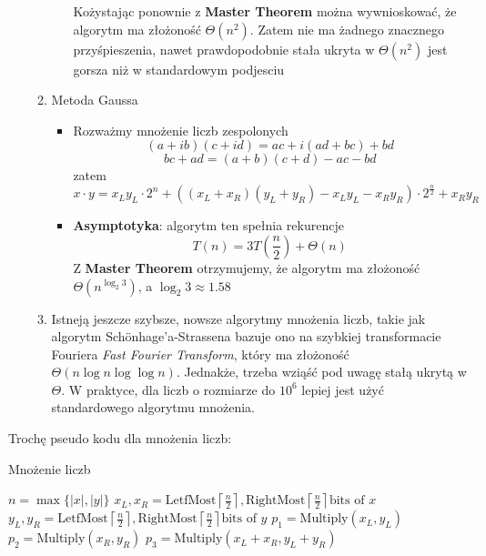 \documentclass[11pt,a4paper]{article}
\begin{document}
\begin{itemize}
\begin{enumerate}
\begin{itemize}
\[                        \]
                        Kożystając ponownie z \textbf{Master Theorem} można wywnioskować, że algorytm ma złożoność $\Theta(n^2)$. Zatem nie ma żadnego znacznego przyśpieszenia, nawet prawdopodobnie stała ukryta w $\Theta(n^2)$ jest gorsza niż w standardowym podjesciu
                \end{itemize}
            \item Metoda Gaussa
                \begin{itemize}
                    \item Rozważmy mnożenie liczb zespolonych
                        \[
                            (a+ib)(c+id) = ac + i(ad+bc) + bd
                        \]
                        \[
                            bc + ad = (a+b)(c+d) - ac - bd
                        \]
                        zatem
                        \[
                            x \cdot y = x_Ly_L \cdot 2^n + ((x_L + x_R)(y_L + y_R) - x_Ly_L - x_Ry_R) \cdot 2^{\frac{n}{2}} + x_Ry_R
                        \]
                    \item \textbf{Asymptotyka}: algorytm ten spełnia rekurencje
                        \[
                            T(n) = 3T(\frac{n}{2}) + \Theta(n)
                        \]
                        Z \textbf{Master Theorem} otrzymujemy, że algorytm ma złożoność $\Theta(n^{\log_2 3})$, a $\log_2 3 \approx 1.58$
                \end{itemize}
            \item Istneją jeszcze szybsze, nowsze algorytmy mnożenia liczb, takie jak algorytm Schönhage'a-Strassena bazuje ono na szybkiej transformacie Fouriera \textit{Fast Fourier Transform}, który ma złożoność $\Theta(n \log n \log \log n)$. Jednakże, trzeba wziąść pod uwagę stałą ukrytą w $\Theta$. W praktyce, dla liczb o rozmiarze do $10^6$ lepiej jest użyć standardowego algorytmu mnożenia.
        \end{enumerate}
\end{itemize}
Trochę pseudo kodu dla mnożenia liczb:
\begin{algorithm}
    \caption{Mnożenie liczb}
    \begin{algorithmic}[1]
        \State $n = \max\{|x|, |y|\}$
        \State {}
        \EndIf
        \State $x_L, x_R = \text{LetfMost}\left\lceil\frac{n}{2}\right\rceil, \text{RightMost}\left\lceil\frac{n}{2}\right\rceil \text{bits of $x$}$
        \State $y_L, y_R = \text{LetfMost}\left\lceil\frac{n}{2}\right\rceil, \text{RightMost}\left\lceil\frac{n}{2}\right\rceil \text{bits of $y$}$
        \State $p_1 = \text{Multiply}(x_L, y_L)$
        \State $p_2 = \text{Multiply}(x_R, y_R)$
        \State $p_3 = \text{Multiply}(x_L + x_R, y_L + y_R)$
        \State {}
        \EndProcedure
    \end{algorithmic}
\end{algorithm}
\end{document}
